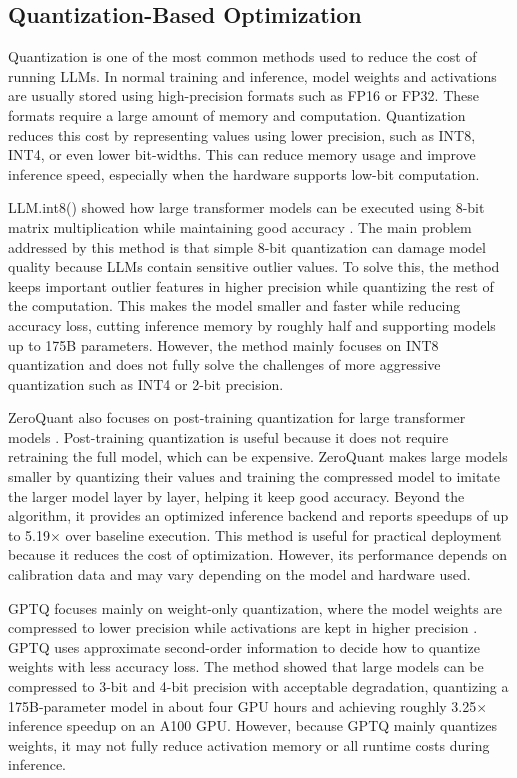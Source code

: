 \subsection{Quantization-Based Optimization}

Quantization is one of the most common methods used to reduce the cost of running LLMs. In normal training and inference, model weights and activations are usually stored using high-precision formats such as FP16 or FP32. These formats require a large amount of memory and computation. Quantization reduces this cost by representing values using lower precision, such as INT8, INT4, or even lower bit-widths. This can reduce memory usage and improve inference speed, especially when the hardware supports low-bit computation.

LLM.int8() showed how large transformer models can be executed using 8-bit matrix multiplication while maintaining good accuracy \cite{dettmers2022llmint8}. The main problem addressed by this method is that simple 8-bit quantization can damage model quality because LLMs contain sensitive outlier values. To solve this, the method keeps important outlier features in higher precision while quantizing the rest of the computation. This makes the model smaller and faster while reducing accuracy loss, cutting inference memory by roughly half and supporting models up to 175B parameters. However, the method mainly focuses on INT8 quantization and does not fully solve the challenges of more aggressive quantization such as INT4 or 2-bit precision.

ZeroQuant also focuses on post-training quantization for large transformer models \cite{yao2022zeroquant}. Post-training quantization is useful because it does not require retraining the full model, which can be expensive. ZeroQuant makes large models smaller by quantizing their values and training the compressed model to imitate the larger model layer by layer, helping it keep good accuracy. Beyond the algorithm, it provides an optimized inference backend and reports speedups of up to 5.19$\times$ over baseline execution. This method is useful for practical deployment because it reduces the cost of optimization. However, its performance depends on calibration data and may vary depending on the model and hardware used.

GPTQ focuses mainly on weight-only quantization, where the model weights are compressed to lower precision while activations are kept in higher precision \cite{frantar2023gptq}. GPTQ uses approximate second-order information to decide how to quantize weights with less accuracy loss. The method showed that large models can be compressed to 3-bit and 4-bit precision with acceptable degradation, quantizing a 175B-parameter model in about four GPU hours and achieving roughly 3.25$\times$ inference speedup on an A100 GPU. However, because GPTQ mainly quantizes weights, it may not fully reduce activation memory or all runtime costs during inference.

